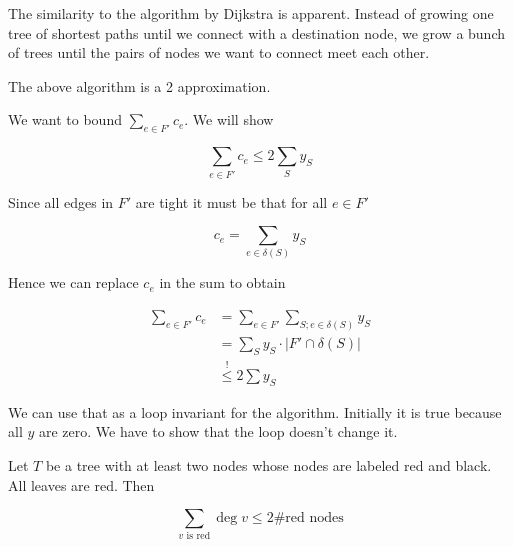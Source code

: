 The similarity to the algorithm by Dijkstra is apparent. Instead of growing one tree of shortest paths until we connect with a destination node, we grow a bunch of trees until the pairs of nodes we want to connect meet each other.

\begin{thm} The above algorithm is a 2 approximation.\end{thm}

\begin{pr} We want to bound $\sum_{e\in F'} c_e$. We will show

\[\sum_{e\in F'} c_e \leq 2 \sum_S y_S\]

Since all edges in $F'$ are tight it must be that for all $e\in F'$ 

\[c_e = \sum_{e\in\delta(S)} y_S\]

Hence we can replace $c_e$ in the sum to obtain

\begin{align*}
\sum_{e\in F'} c_e &= \sum_{e\in F'} \sum_{S; e\in \delta(S)} y_S\\
	&= \sum_S  y_S \cdot |F'\cap \delta(S)|\\
	&\stackrel{!}{\leq} 2\sum y_S
\end{align*}

We can use that as a loop invariant for the algorithm. Initially it is true because all $y$ are zero. We have to show that the loop doesn't change it.

\begin{lem} Let $T$ be a tree with at least two nodes whose nodes are labeled red and black. All leaves are red. Then

\[\sum_{v\text{ is red}} \deg v \leq 2 \text{\# red nodes}\]

\end{lem}
\end{pr}